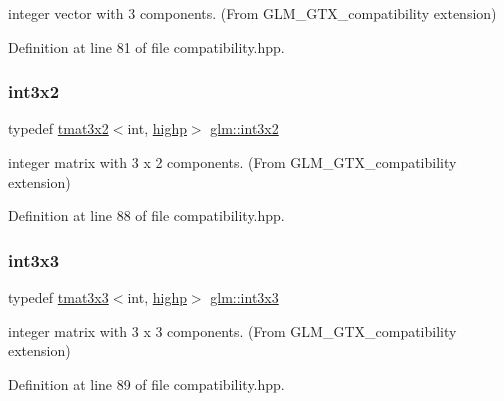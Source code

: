 integer vector with 3 components. (From G\+L\+M\+\_\+\+G\+T\+X\+\_\+compatibility extension) 



Definition at line 81 of file compatibility.\+hpp.

\mbox{\label{group__gtx__compatibility_gac99c78a227d95384611146a64c4d3ce8}} 
\subsubsection{\texorpdfstring{int3x2}{int3x2}}
{\footnotesize\ttfamily typedef \mbox{\hyperlink{structglm_1_1tmat3x2}{tmat3x2}}$<$int, \mbox{\hyperlink{namespaceglm_a0f04f086094c747d227af4425893f545ac6f7eab42eacbb10d59a58e95e362074}{highp}}$>$ \mbox{\hyperlink{group__gtx__compatibility_gac99c78a227d95384611146a64c4d3ce8}{glm\+::int3x2}}}



integer matrix with 3 x 2 components. (From G\+L\+M\+\_\+\+G\+T\+X\+\_\+compatibility extension) 



Definition at line 88 of file compatibility.\+hpp.

\mbox{\label{group__gtx__compatibility_ga4eb54b9ea96f12c04faaf2ca7b7c8c70}} 
\subsubsection{\texorpdfstring{int3x3}{int3x3}}
{\footnotesize\ttfamily typedef \mbox{\hyperlink{structglm_1_1tmat3x3}{tmat3x3}}$<$int, \mbox{\hyperlink{namespaceglm_a0f04f086094c747d227af4425893f545ac6f7eab42eacbb10d59a58e95e362074}{highp}}$>$ \mbox{\hyperlink{group__gtx__compatibility_ga4eb54b9ea96f12c04faaf2ca7b7c8c70}{glm\+::int3x3}}}



integer matrix with 3 x 3 components. (From G\+L\+M\+\_\+\+G\+T\+X\+\_\+compatibility extension) 



Definition at line 89 of file compatibility.\+hpp.

\mbox{\label{group__gtx__compatibility_ga7500192cce87fb3a48f7119d6646af5a}} 
